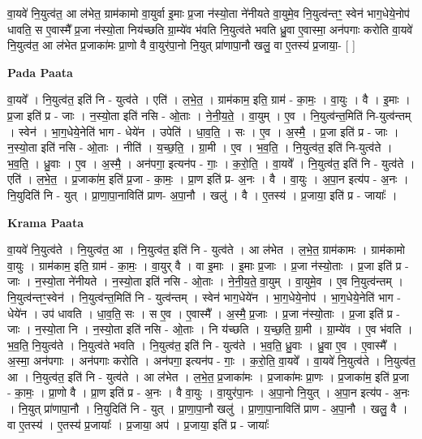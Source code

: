 \documentclass[17pt]{extarticle}
\begin{document}
वा॒यवे॑ नि॒युत्व॑त॒ आ ल॑भेत॒ ग्राम॑कामो वा॒युर्वा इ॒माः प्र॒जा न॑स्यो॒ता ने॑नीयते वा॒युमे॒व नि॒युत्व॑न्तꣳ॒॒ स्वेन॑ भाग॒धेये॒नोप॑ धावति॒ स ए॒वास्मै᳚ प्र॒जा न॑स्यो॒ता निय॑च्छति ग्रा॒म्ये॑व भ॑वति नि॒युत्व॑ते भवति ध्रु॒वा ए॒वास्मा॒ अन॑पगाः करोति वा॒यवे॑ नि॒युत्व॑त॒ आ ल॑भेत प्र॒जाका॑मः प्रा॒णो वै वा॒युर॑पा॒नो नि॒युत् प्रा॑णापा॒नौ खलु॒ वा ए॒तस्य॑ प्र॒जाया॒-  [  ] \newline

\textbf{Pada Paata} \newline

वा॒यवे᳚ । नि॒युत्व॑त॒ इति॑ नि - युत्व॑ते । एति॑ । ल॒भे॒त॒ । ग्राम॑काम॒ इति॒ ग्राम॑ - का॒मः॒ । वा॒युः । वै । इ॒माः । प्र॒जा इति॑ प्र - जाः । न॒स्यो॒ता इति॑ नसि - ओ॒ताः । ने॒नी॒य॒ते॒ । वा॒युम् । ए॒व । नि॒युत्व॑न्त॒मिति॑ नि-युत्व॑न्तम् । स्वेन॑ । भा॒ग॒धेये॒नेति॑ भाग - धेये॑न । उपेति॑ । धा॒व॒ति॒ । सः । ए॒व । अ॒स्मै॒ । प्र॒जा इति॑ प्र - जाः । न॒स्यो॒ता इति॑ नसि - ओ॒ताः । नीति॑ । य॒च्छ॒ति॒ । ग्रा॒मी । ए॒व । भ॒व॒ति॒ । नि॒युत्व॑त॒ इति॑ नि-युत्व॑ते । भ॒व॒ति॒ । ध्रु॒वाः । ए॒व । अ॒स्मै॒ । अन॑पगा॒ इत्यन॑प - गाः॒ । क॒रो॒ति॒ । वा॒यवे᳚ । नि॒युत्व॑त॒ इति॑ नि - युत्व॑ते । एति॑ । ल॒भे॒त॒ । प्र॒जाका॑म॒ इति॑ प्र॒जा - का॒मः॒ । प्रा॒ण इति॑ प्र- अ॒नः । वै । वा॒युः । अ॒पा॒न इत्य॑प - अ॒नः । नि॒युदिति॑ नि - युत् । प्रा॒णा॒पा॒नाविति॑ प्राण- अ॒पा॒नौ । खलु॑ । वै । ए॒तस्य॑ । प्र॒जाया॒ इति॑ प्र - जायाः᳚ ।  \newline


\textbf{Krama Paata} \newline

वा॒यवे॑ नि॒युत्व॑ते । नि॒युत्व॑त॒ आ । नि॒युत्व॑त॒ इति॑ नि - युत्व॑ते । आ ल॑भेत । ल॒भे॒त॒ ग्राम॑कामः । ग्राम॑कामो वा॒युः । ग्राम॑काम॒ इति॒ ग्राम॑ - का॒मः॒ । वा॒युर् वै । वा इ॒माः । इ॒माः प्र॒जाः । प्र॒जा न॑स्यो॒ताः । प्र॒जा इति॑ प्र - जाः । न॒स्यो॒ता ने॑नीयते । न॒स्यो॒ता इति॑ नसि - ओ॒ताः । ने॒नी॒य॒ते॒ वा॒युम् । वा॒युमे॒व । ए॒व नि॒युत्व॑न्तम् । नि॒युत्व॑न्तꣳ॒॒स्वेन॑ । नि॒युत्व॑न्त॒मिति॑ नि - युत्व॑न्तम् । स्वेन॑ भाग॒धेये॑न । भा॒ग॒धेये॒नोप॑ । भा॒ग॒धेये॒नेति॑ भाग - धेये॑न । उप॑ धावति । धा॒व॒ति॒ सः । स ए॒व । ए॒वास्मै᳚ । अ॒स्मै॒ प्र॒जाः । प्र॒जा न॑स्यो॒ताः । प्र॒जा इति॑ प्र - जाः । न॒स्यो॒ता नि । 
न॒स्यो॒ता इति॑ नसि - ओ॒ताः । नि य॑च्छति । य॒च्छ॒ति॒ ग्रा॒मी । ग्रा॒म्ये॑व । ए॒व भ॑वति । भ॒व॒ति॒ नि॒युत्व॑ते । नि॒युत्व॑ते भवति । नि॒युत्व॑त॒ इति॑ नि - युत्व॑ते । भ॒व॒ति॒ ध्रु॒वाः । ध्रु॒वा ए॒व । ए॒वास्मै᳚ । अ॒स्मा॒ अन॑पगाः । अन॑पगाः करोति । अन॑पगा॒ इत्यन॑प - गाः॒ । क॒रो॒ति॒ वा॒यवे᳚ । वा॒यवे॑ नि॒युत्व॑ते । नि॒युत्व॑त॒ आ । नि॒युत्व॑त॒ इति॑ नि - युत्व॑ते । आ ल॑भेत । ल॒भे॒त॒ प्र॒जाका॑मः । प्र॒जाका॑मः प्रा॒णः । प्र॒जाका॑म॒ इति॑ प्र॒जा - का॒मः॒ । प्रा॒णो वै । प्रा॒ण इति॑ प्र - अ॒नः । वै वा॒युः । वा॒युर॑पा॒नः । अ॒पा॒नो नि॒युत् । अ॒पा॒न इत्य॑प - अ॒नः । नि॒युत् प्रा॑णापा॒नौ । नि॒युदिति॑ नि - युत् । प्रा॒णा॒पा॒नौ खलु॑ । प्रा॒णा॒पा॒नाविति॑ प्राण - अ॒पा॒नौ । खलु॒ वै । वा ए॒तस्य॑ । ए॒तस्य॑ प्र॒जायाः᳚ । प्र॒जाया॒  अप॑ । प्र॒जाया॒ इति॑ प्र - जायाः᳚ \newline
\end{document}
